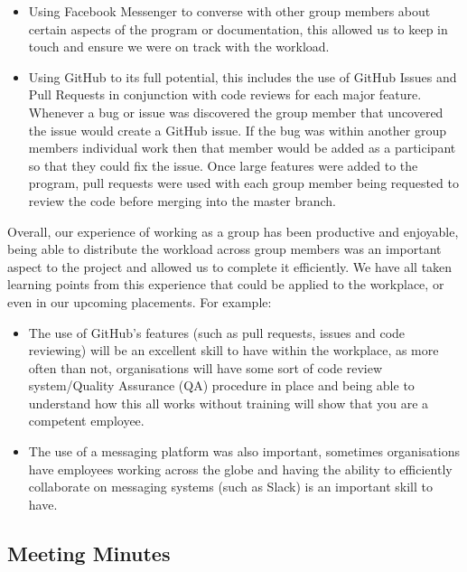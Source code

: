 \documentclass[
  english,
  a4paper,
,tablecaptionabove
]{scrartcl}
\providecommand{\tightlist}{%
  \setlength{\itemsep}{0pt}\setlength{\parskip}{0pt}}
\begin{document}
\begin{itemize}
\tightlist
\item
  Using Facebook Messenger to converse with other group members about
  certain aspects of the program or documentation, this allowed us to
  keep in touch and ensure we were on track with the workload.
\item
  Using GitHub to its full potential, this includes the use of GitHub
  Issues and Pull Requests in conjunction with code reviews for each
  major feature. Whenever a bug or issue was discovered the group member
  that uncovered the issue would create a GitHub issue. If the bug was
  within another group members individual work then that member would be
  added as a participant so that they could fix the issue. Once large
  features were added to the program, pull requests were used with each
  group member being requested to review the code before merging into
  the master branch.
\end{itemize}

Overall, our experience of working as a group has been productive and
enjoyable, being able to distribute the workload across group members
was an important aspect to the project and allowed us to complete it
efficiently. We have all taken learning points from this experience that
could be applied to the workplace, or even in our upcoming placements.
For example:

\begin{itemize}
\tightlist
\item
  The use of GitHub's features (such as pull requests, issues and code
  reviewing) will be an excellent skill to have within the workplace, as
  more often than not, organisations will have some sort of code review
  system/Quality Assurance (QA) procedure in place and being able to
  understand how this all works without training will show that you are
  a competent employee.
\item
  The use of a messaging platform was also important, sometimes
  organisations have employees working across the globe and having the
  ability to efficiently collaborate on messaging systems (such as
  Slack) is an important skill to have.
\end{itemize}

\hypertarget{meeting-minutes}{%
\subsection{Meeting Minutes}\label{meeting-minutes}}
\end{document}
